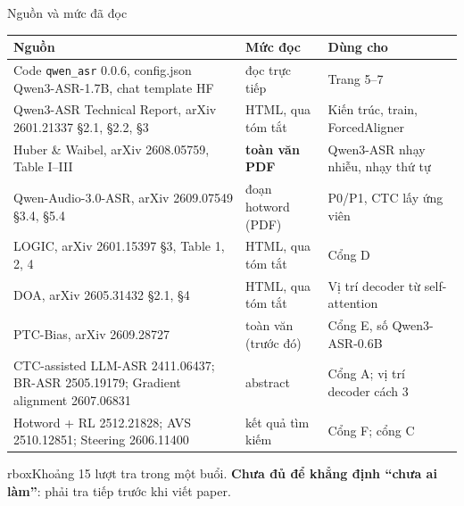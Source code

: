 \documentclass[aspectratio=169,xcolor=table]{beamer}
\newcommand{\bsz}{\footnotesize}%
\newcommand{\yeu}[1]{\begin{beamercolorbox}[sep=0.40em,rounded=true]{rbox}\bsz #1\end{beamercolorbox}}
\begin{document}
\begin{frame}{Nguồn và mức đã đọc}
\renewcommand{\arraystretch}{1.08}\scriptsize
\begin{tabular}{L{6.3cm}L{2.7cm}L{5.0cm}}
\toprule
Nguồn & Mức đọc & Dùng cho \\
\midrule
Code \texttt{qwen\_asr} 0.0.6, config.json Qwen3-ASR-1.7B, chat template HF & đọc trực tiếp & Trang 5--7 \\
Qwen3-ASR Technical Report, arXiv 2601.21337 §2.1, §2.2, §3 & HTML, qua tóm tắt & Kiến trúc, train, ForcedAligner \\
Huber \& Waibel, arXiv 2608.05759, Table I--III & \textbf{toàn văn PDF} & Qwen3-ASR nhạy nhiễu, nhạy thứ tự \\
Qwen-Audio-3.0-ASR, arXiv 2609.07549 §3.4, §5.4 & đoạn hotword (PDF) & P0/P1, CTC lấy ứng viên \\
LOGIC, arXiv 2601.15397 §3, Table 1, 2, 4 & HTML, qua tóm tắt & Cổng D \\
DOA, arXiv 2605.31432 §2.1, §4 & HTML, qua tóm tắt & Vị trí decoder từ self-attention \\
PTC-Bias, arXiv 2609.28727 & toàn văn (trước đó) & Cổng E, số Qwen3-ASR-0.6B \\
CTC-assisted LLM-ASR 2411.06437; BR-ASR 2505.19179; Gradient alignment 2607.06831 & abstract & Cổng A; vị trí decoder cách 3 \\
Hotword + RL 2512.21828; AVS 2510.12851; Steering 2606.11400 & kết quả tìm kiếm & Cổng F; cổng C \\
\bottomrule
\end{tabular}
\vspace{0.2cm}

\yeu{Khoảng 15 lượt tra trong một buổi. \textbf{Chưa đủ để khẳng định ``chưa ai làm''}: phải tra tiếp trước khi viết paper.}
\end{frame}
\end{document}
